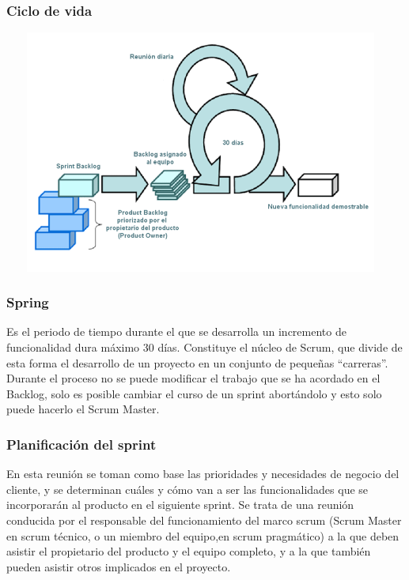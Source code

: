 \subsubsection{Ciclo de vida}

\begin{center}
	\includegraphics[width=13cm,height=8cm]{img/scrum.png}
\end{center}

\subsubsection{Spring}
\setlength{\parskip}{5mm}

	Es el periodo de tiempo durante el que se desarrolla un incremento de funcionalidad dura máximo 30 días. Constituye el núcleo de Scrum, que divide de esta forma el desarrollo de un proyecto en un conjunto de pequeñas “carreras”. Durante el proceso no se puede modificar el trabajo que se ha acordado en el Backlog, solo es posible cambiar el curso de un sprint abortándolo y esto solo puede hacerlo el Scrum Master. 
	
\setlength{\parskip}{0mm}

\subsubsection{Planificación del sprint}
\setlength{\parskip}{5mm}

	En esta reunión se toman como base las prioridades y necesidades de negocio del cliente, y se determinan cuáles y cómo van a ser las funcionalidades que se incorporarán al producto en el siguiente sprint. Se trata de  una reunión conducida por  el responsable del funcionamiento  del marco scrum (Scrum Master en scrum técnico, o un miembro del equipo,en scrum pragmático) a la que deben asistir el propietario del producto y el equipo completo, y a la que también pueden asistir otros implicados en el proyecto.

